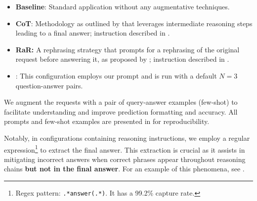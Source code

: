 \begin{itemize}[noitemsep,topsep=0.5em,parsep=0.4em,leftmargin=0.8em]
\item \textbf{Baseline}: Standard application without any augmentative techniques.
\item \textbf{CoT}: Methodology as outlined by \citet{weiChainofThoughtPromptingElicits2023} that leverages intermediate reasoning steps leading to a final answer; instruction described in .
\item \textbf{RaR:} A rephrasing strategy that prompts for a rephrasing of the original request before answering it, as proposed by \citet{dengRephraseRespondLet2024}; instruction described in .
\item \textbf{\rephrase}: This configuration employs our prompt and is run with a default $N\!=\!3$ question-answer pairs.
\end{itemize}

We augment the requests with a pair of query-answer examples (few-shot) to facilitate understanding and improve prediction formatting and accuracy. All prompts and few-shot examples are presented in  for reproducibility.

\pagebreak

Notably, in configurations containing reasoning instructions, we employ a regular expression\footnote{Regex pattern: \texttt{.*answer(.*)}. It has a 99.2\% capture rate.} to extract the final answer. This extraction is crucial as it assists in mitigating incorrect answers when correct phrases appear throughout reasoning chains \textbf{but not in the final answer}. For an example of this phenomena, see .
